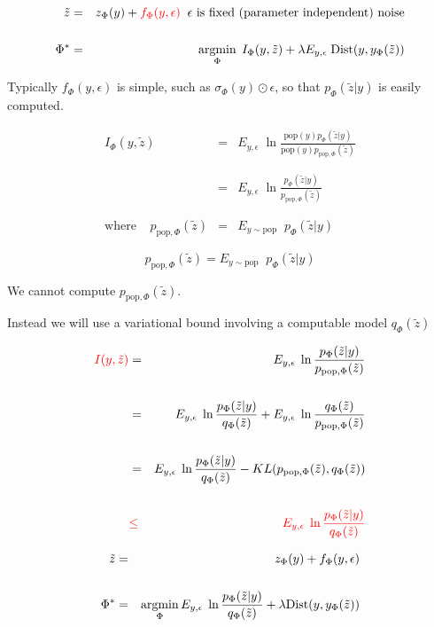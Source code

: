 {

\bigskip
\bigskip
\begin{eqnarray*}
\tilde{z} & = & z_\Phi(y) + {\color{red} f_\Phi(y,\epsilon)} \;\;\mbox{$\epsilon$ is fixed (parameter independent) noise} \\
\\
\Phi^* & = & \operatorname*{argmin}_\Phi \;I_\Phi(y,\tilde{z}) + \lambda E_{y,\epsilon}\; \mathrm{Dist}(y,y_\Phi(\tilde{z}))
\end{eqnarray*}

\vfill
Typically $f_\Phi(y,\epsilon)$ is simple, such as $\sigma_\Phi(y)\odot \epsilon$, so that {\color{red} $p_\Phi(\tilde{z}|y)$ is easily computed.}


\begin{eqnarray*}
I_\Phi(y,\tilde{z})  & = & E_{y,\epsilon}\; \ln \frac{\mathrm{pop}(y)p_\Phi(\tilde{z}|y)}{\mathrm{pop}(y)p_{\mathrm{pop},\Phi}(\tilde{z})} \\
\\
\\
& = & E_{y,\epsilon}\;\ln \frac{p_\Phi(\tilde{z}|y)}{p_{\mathrm{pop},\Phi}(\tilde{z})} \\
\\
\\
\mathrm{where}\;\;\;\;p_{\mathrm{pop},\Phi}(\tilde{z}) & = & E_{y\sim \mathrm{pop}}\;\;p_\Phi(\tilde{z}|y)
\end{eqnarray*}


$$p_{\mathrm{pop},\Phi}(\tilde{z})  = E_{y\sim \mathrm{pop}}\;\;p_\Phi(\tilde{z}|y)$$

\vfill
We cannot compute $p_{\mathrm{pop},\Phi}(\tilde{z})$.

\vfill
Instead we will use a variational bound involving a computable model $q_\Phi(\tilde{z})$


\begin{eqnarray*}
{\color{red} I(y,\tilde{z})}  & = & E_{y,\epsilon}\;\ln \frac{p_\Phi(\tilde{z}|y)}{p_{\mathrm{pop},\Phi}(\tilde{z})} \\
\\
& = & E_{y,\epsilon}\;\ln \frac{p_\Phi(\tilde{z}|y)}{q_\Phi(\tilde{z})} + E_{y,\epsilon}\;\ln\frac{q_\Phi(\tilde{z})}{p_{\mathrm{pop},\Phi}(\tilde{z})} \\
\\
& = & E_{y,\epsilon}\;\ln \frac{p_\Phi(\tilde{z}|y)}{q_\Phi(\tilde{z})} - KL(p_{\mathrm{pop},\Phi}(\tilde{z}),q_\Phi(\tilde{z})) \\
\\
& {\color{red} \leq} & {\color{red} E_{y,\epsilon}\;\ln \frac{p_\Phi(\tilde{z}|y)}{q_\Phi(\tilde{z})}}
\end{eqnarray*}


\begin{eqnarray*}
\tilde{z} & = & z_\Phi(y) + f_\Phi(y,\epsilon) \\
\\
\Phi^* & = & \operatorname*{argmin}_\Phi E_{y,\epsilon}\;\ln \frac{p_\Phi(\tilde{z}|y)}{q_\Phi(\tilde{z})} + \lambda \mathrm{Dist}(y,y_\Phi(\tilde{z}))
\end{eqnarray*}


}

